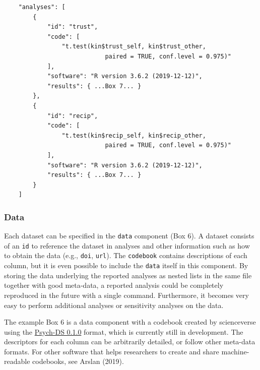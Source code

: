 \documentclass[
  english,
  doc,floatsintext]{apa6}
\begin{document}
\begin{tcolorbox}[colback=black!5!white,colframe=white!5!black,title=Box 5. The analysis component.]
\begin{verbatim}
    "analyses": [
        {
            "id": "trust",
            "code": [
                "t.test(kin$trust_self, kin$trust_other, 
                            paired = TRUE, conf.level = 0.975)"
            ],
            "software": "R version 3.6.2 (2019-12-12)",
            "results": { ...Box 7... }
        },
        {
            "id": "recip",
            "code": [
                "t.test(kin$recip_self, kin$recip_other, 
                            paired = TRUE, conf.level = 0.975)"
            ],
            "software": "R version 3.6.2 (2019-12-12)",
            "results": { ...Box 7... }
        }
    ]
\end{verbatim}
\end{tcolorbox}

\hypertarget{data}{%
\subsubsection{Data}\label{data}}

Each dataset can be specified in the \texttt{data} component (Box 6). A dataset consists of an \texttt{id} to reference the dataset in analyses and other information such as how to obtain the data (e.g., \texttt{doi}, \texttt{url}). The \texttt{codebook} contains descriptions of each column, but it is even possible to include the \texttt{data} itself in this component. By storing the data underlying the reported analyses as nested lists in the same file together with good meta-data, a reported analysis could be completely reproduced in the future with a single command. Furthermore, it becomes very easy to perform additional analyses or sensitivity analyses on the data.

The example Box 6 is a data component with a codebook created by scienceverse using the \href{https://docs.google.com/document/d/1u8o5jnWk0Iqp_J06PTu5NjBfVsdoPbBhstht6W0fFp0/edit\#heading=h.caxnnxqaobj}{Psych-DS 0.1.0} format, which is currently still in development. The descriptors for each column can be arbitrarily detailed, or follow other meta-data formats. For other software that helps researchers to create and share machine-readable codebooks, see Arslan (2019).
\end{document}
